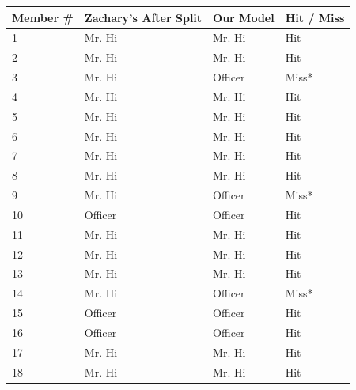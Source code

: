 \documentclass[letterpaper,11pt]{report}
\begin{document}
\begin{savenotes}
\begin{table}
    \begin{tabular}{|l|l|l|l|}
    \hline
    Member \#          & Zachary's After Split & Our Model & Hit / Miss         \\ \hline
    1                  & Mr. Hi                & Mr. Hi    & Hit                \\ \hline
    2                  & Mr. Hi                & Mr. Hi    & Hit                \\ \hline
    3                  & Mr. Hi                & Officer   & Miss*               \\ \hline
    4                  & Mr. Hi                & Mr. Hi    & Hit                \\ \hline
    5                  & Mr. Hi                & Mr. Hi    & Hit                \\ \hline
    6                  & Mr. Hi                & Mr. Hi    & Hit                \\ \hline
    7                  & Mr. Hi                & Mr. Hi    & Hit                \\ \hline
    8                  & Mr. Hi                & Mr. Hi    & Hit                \\ \hline
    9                  & Mr. Hi                & Officer   & Miss*               \\ \hline
    10                 & Officer               & Officer   & Hit                \\ \hline
    11                 & Mr. Hi                & Mr. Hi    & Hit                \\ \hline
    12                 & Mr. Hi                & Mr. Hi    & Hit                \\ \hline
    13                 & Mr. Hi                & Mr. Hi    & Hit                \\ \hline
    14                 & Mr. Hi                & Officer   & Miss*               \\ \hline
    15                 & Officer               & Officer   & Hit                \\ \hline
    16                 & Officer               & Officer   & Hit                \\ \hline
    17                 & Mr. Hi                & Mr. Hi    & Hit                \\ \hline
    18                 & Mr. Hi                & Mr. Hi    & Hit                \\ \hline

\end{tabular}
\end{table}
\end{savenotes}
\end{document}
